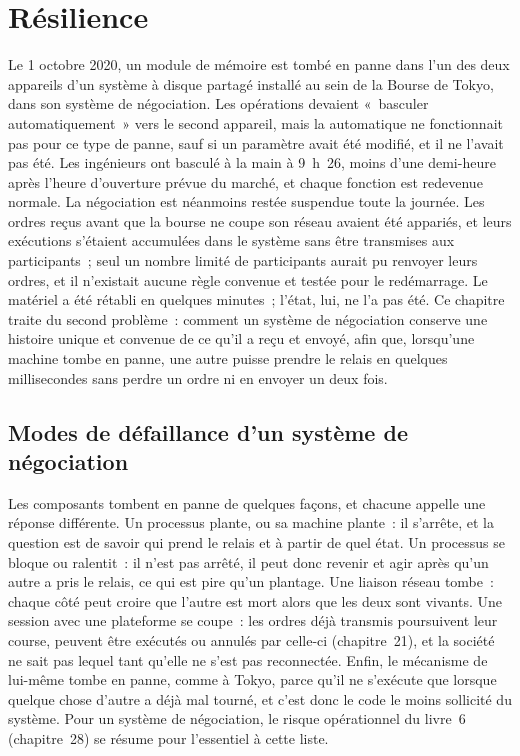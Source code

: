 \chapter{Résilience}\label{ch:ll:resilience}

Le 1 octobre 2020, un module de mémoire est tombé en panne dans l'un des deux appareils d'un système à disque partagé installé au sein de la Bourse de
Tokyo, dans son système de négociation. Les opérations devaient «~basculer automatiquement~» vers le second appareil, mais la  automatique
ne fonctionnait pas pour ce type de panne, sauf si un paramètre avait été modifié, et il ne l'avait pas été. Les ingénieurs ont basculé
à la main à 9~h~26, moins d'une demi-heure après l'heure d'ouverture prévue du marché, et chaque fonction est redevenue normale. La
négociation est néanmoins restée suspendue toute la journée. Les ordres reçus avant que la bourse ne coupe son réseau avaient été appariés, et
leurs exécutions s'étaient accumulées dans le système sans être transmises aux participants~; seul un nombre limité de
participants aurait pu renvoyer leurs ordres, et il n'existait aucune règle convenue et testée pour le redémarrage. Le matériel a été rétabli en
quelques minutes~; l'état, lui, ne l'a pas été. Ce chapitre traite du second problème~: comment un système de négociation conserve une histoire unique et convenue de ce
qu'il a reçu et envoyé, afin que, lorsqu'une machine tombe en panne, une autre puisse prendre le relais en quelques millisecondes sans perdre un ordre
ni en envoyer un deux fois.

\section{Modes de défaillance d'un système de négociation}

Les composants tombent en panne de quelques façons, et chacune appelle une réponse différente. Un processus plante, ou sa machine plante~: il s'arrête, et la
question est de savoir qui prend le relais et à partir de quel état. Un processus se bloque ou ralentit~: il n'est pas arrêté, il peut donc revenir et
agir après qu'un autre a pris le relais, ce qui est pire qu'un plantage. Une liaison réseau tombe~: chaque côté peut croire que
l'autre est mort alors que les deux sont vivants. Une session avec une plateforme se coupe~: les ordres déjà transmis poursuivent leur course, peuvent être exécutés ou
annulés par celle-ci (chapitre~21), et la société ne sait pas lequel tant qu'elle ne s'est pas reconnectée. Enfin, le mécanisme de  lui-même tombe en panne, comme à
Tokyo, parce qu'il ne s'exécute que lorsque quelque chose d'autre a déjà mal tourné, et c'est donc le code le moins sollicité du
système. Pour un système de négociation, le risque opérationnel du livre~6 (chapitre~28) se résume pour l'essentiel à cette liste.

